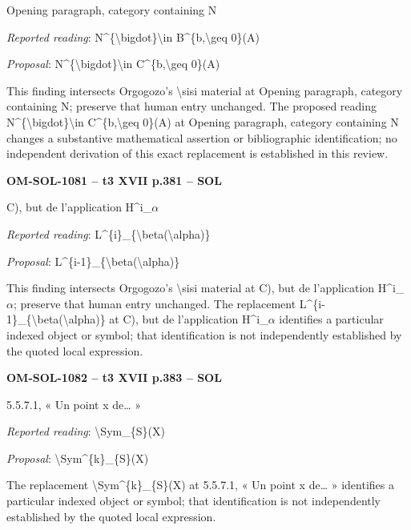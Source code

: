 Opening paragraph, category containing N\par
\emph{Reported reading}: N\textasciicircum{}\{\textbackslash{}bigdot\}\textbackslash{}in B\textasciicircum{}\{b,\textbackslash{}geq 0\}(A)\par
\emph{Proposal}: N\textasciicircum{}\{\textbackslash{}bigdot\}\textbackslash{}in C\textasciicircum{}\{b,\textbackslash{}geq 0\}(A)\par
This finding intersects Orgogozo's \textbackslash{}sisi material at Opening paragraph, category containing N; preserve that human entry unchanged. The proposed reading N\textasciicircum{}\{\textbackslash{}bigdot\}\textbackslash{}in C\textasciicircum{}\{b,\textbackslash{}geq 0\}(A) at Opening paragraph, category containing N changes a substantive mathematical assertion or bibliographic identification; no independent derivation of this exact replacement is established in this review.\par
\par\noindent\textbf{OM-SOL-1081 -- t3 XVII p.381 -- SOL}\par
C), but de l'application H\textasciicircum{}i\_\ensuremath{\alpha}\par
\emph{Reported reading}: L\textasciicircum{}\{i\}\_\{\textbackslash{}beta(\textbackslash{}alpha)\}\par
\emph{Proposal}: L\textasciicircum{}\{i-1\}\_\{\textbackslash{}beta(\textbackslash{}alpha)\}\par
This finding intersects Orgogozo's \textbackslash{}sisi material at C), but de l'application H\textasciicircum{}i\_\ensuremath{\alpha}; preserve that human entry unchanged. The replacement L\textasciicircum{}\{i-1\}\_\{\textbackslash{}beta(\textbackslash{}alpha)\} at C), but de l'application H\textasciicircum{}i\_\ensuremath{\alpha} identifies a particular indexed object or symbol; that identification is not independently established by the quoted local expression.\par
\par\noindent\textbf{OM-SOL-1082 -- t3 XVII p.383 -- SOL}\par
5.5.7.1, « Un point x de… »\par
\emph{Reported reading}: \textbackslash{}Sym\_\{S\}(X)\par
\emph{Proposal}: \textbackslash{}Sym\textasciicircum{}\{k\}\_\{S\}(X)\par
The replacement \textbackslash{}Sym\textasciicircum{}\{k\}\_\{S\}(X) at 5.5.7.1, « Un point x de… » identifies a particular indexed object or symbol; that identification is not independently established by the quoted local expression.\par
